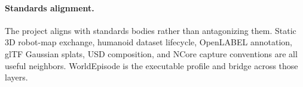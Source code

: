 \paragraph{Standards alignment.}
The project aligns with standards bodies rather than antagonizing them. Static 3D robot-map
exchange, humanoid dataset lifecycle, OpenLABEL annotation, glTF Gaussian splats, USD composition,
and NCore capture conventions are all useful neighbors. WorldEpisode is the executable profile and
bridge across those layers.
